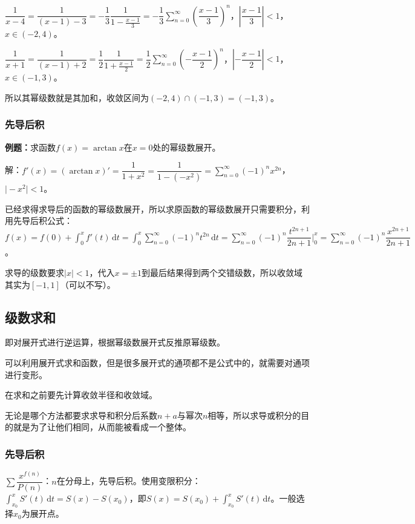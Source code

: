 $\dfrac{1}{x-4}=\dfrac{1}{(x-1)-3}=-\dfrac{1}{3}\dfrac{1}{1-\frac{x-1}{3}}=-\dfrac{1}{3}\sum\limits_{n=0}^\infty\left(\dfrac{x-1}{3}\right)^n$，$\left\vert\dfrac{x-1}{3}\right\vert<1$，$x\in(-2,4)$。

$\dfrac{1}{x+1}=\dfrac{1}{(x-1)+2}=\dfrac{1}{2}\dfrac{1}{1+\frac{x-1}{2}}=\dfrac{1}{2}\sum\limits_{n=0}^\infty\left(-\dfrac{x-1}{2}\right)^n$，$\left\vert-\dfrac{x-1}{2}\right\vert<1$，$x\in(-1,3)$。

所以其幂级数就是其加和，收敛区间为$(-2,4)\cap(-1,3)=(-1,3)$。

\subsubsection{先导后积}

\textbf{例题：}求函数$f(x)=\arctan x$在$x=0$处的幂级数展开。

解：$f'(x)=(\arctan x)'=\dfrac{1}{1+x^2}=\dfrac{1}{1-(-x^2)}=\sum\limits_{n=0}^\infty(-1)^nx^{2n}$，$\vert-x^2\vert<1$。

已经求得求导后的函数的幂级数展开，所以求原函数的幂级数展开只需要积分，利用先导后积公式：$f(x)=f(0)+\int_0^xf'(t)\,\textrm{d}t=\int_0^x\sum\limits_{n=0}^\infty(-1)^nt^{2n}\,\textrm{d}t=\sum\limits_{n=0}^\infty(-1)^n\dfrac{t^{2n+1}}{2n+1}\bigg|_0^x=\sum\limits_{n=0}^\infty(-1)^n\dfrac{x^{2n+1}}{2n+1}$。

求导的级数要求$\vert x\vert<1$，代入$x=\pm1$到最后结果得到两个交错级数，所以收敛域其实为$[-1,1]$（可以不写）。

\subsection{级数求和}

即对展开式进行逆运算，根据幂级数展开式反推原幂级数。

可以利用展开式求和函数，但是很多展开式的通项都不是公式中的，就需要对通项进行变形。

在求和之前要先计算收敛半径和收敛域。

无论是哪个方法都要求求导和积分后系数$n+a$与幂次$n$相等，所以求导或积分的目的就是为了让他们相同，从而能被看成一个整体。

\subsubsection{先导后积}

$\sum\dfrac{x^{f(n)}}{P(n)}$：$n$在分母上，先导后积。使用变限积分：$\int_{x_0}^xS'(t)\,\textrm{d}t=S(x)-S(x_0)$，即$S(x)=S(x_0)+\int_{x_0}^xS'(t)\,\textrm{d}t$。一般选择$x_0$为展开点。


